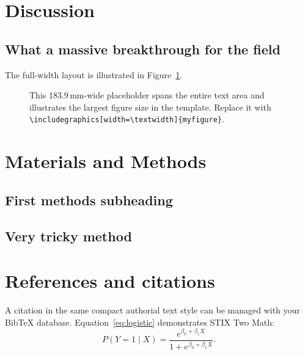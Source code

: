 \documentclass{biorxiv-chrelli}
\begin{document}
\section{Discussion}
\lipsum[9]\lipsum[10]
\subsection{What a massive breakthrough for the field}
The full-width layout is illustrated in Figure~\ref{fig:fullwidth}.
\lipsum[11]

\begin{figure}[t]
  \centering
  \colorbox{biorxivblue}{\parbox[c][39mm][c]{\dimexpr\textwidth-2\fboxsep\relax}{\strut}}
  \caption{
    This 183.9\,mm-wide placeholder spans the entire text area and illustrates
    the largest figure size in the template. Replace it with
    \texttt{\textbackslash includegraphics[width=\textbackslash textwidth]\{myfigure\}}.}
  \label{fig:fullwidth}
\end{figure}

\lipsum[15]

\section{Materials and Methods}
{\MethodsText
\subsection{First methods subheading}
\lipsum[12]
\subsection{Very tricky method}
\lipsum[13-14]
\lipsum[16-23]
}

\section{References and citations}
A citation in the same compact authorial text style \citep{example2026}
can be managed with your BibTeX database. Equation~\ref{eq:logistic}
demonstrates STIX Two Math:
\begin{equation}
  \label{eq:logistic}
  P(Y\!=\!1\mid X)=\frac{e^{\beta_0+\beta_1X}}{1+e^{\beta_0+\beta_1X}}.
\end{equation}
\end{document}
